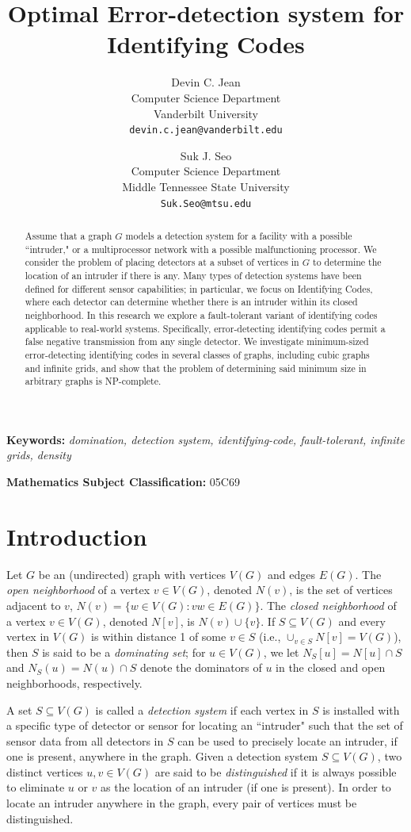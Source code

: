 \documentclass{article}
\title{Optimal Error-detection system for Identifying Codes}
\author{
    \small Devin C. Jean\\
    \small Computer Science Department \\
    \small Vanderbilt University\\
    \small \texttt{devin.c.jean@vanderbilt.edu}
    \and
    \small Suk J. Seo\\
    \small Computer Science Department\\
    \small Middle Tennessee State University\\
    \small \texttt{Suk.Seo@mtsu.edu}
}
\date{}
\begin{document}
\maketitle
\thispagestyle{empty}

\begin{abstract}
Assume that a graph $G$ models a detection system for a facility with a possible ``intruder," or a multiprocessor network with a possible malfunctioning processor.
We consider the problem of placing detectors at a subset of vertices in $G$ to determine the location of an intruder if there is any.
Many types of detection systems have been defined for different sensor capabilities; in particular, we focus on Identifying Codes, where each detector can determine whether there is an intruder within its closed neighborhood.
In this research we explore a fault-tolerant variant of identifying codes applicable to real-world systems.
Specifically, error-detecting identifying codes permit a false negative transmission from any single detector.
We investigate minimum-sized error-detecting identifying codes in several classes of graphs, including cubic graphs and infinite grids, and show that the problem of determining said minimum size in arbitrary graphs is NP-complete.
\end{abstract}

\noindent
\textbf{Keywords:} \textit{domination, detection system, identifying-code, fault-tolerant, infinite grids, density}
\vspace{1em}

\noindent
\textbf{Mathematics Subject Classification:} 05C69

\section{Introduction}
Let $G$ be an (undirected) graph with vertices $V(G)$ and edges $E(G)$.
The \textit{open neighborhood} of a vertex $v \in V(G)$, denoted $N(v)$, is
the set of vertices adjacent to $v$, $N(v) = \{w\in V(G): vw\in E(G)\}$.
The \textit{closed neighborhood} of a vertex $v \in V(G)$, denoted $N[v]$, is $N(v) \cup \{v\}$.
If $S \subseteq V(G)$ and every vertex in $V(G)$ is within distance 1 of some $v \in S$ (i.e., $\cup_{v \in S}{N[v]} = V(G)$), then $S$ is said to be a \emph{dominating set}; for $u \in V(G)$, we let $N_S[u] = N[u] \cap S$ and $N_S(u) = N(u) \cap S$ denote the dominators of $u$ in the closed and open neighborhoods, respectively.

A set $S \subseteq V(G)$ is called a \emph{detection system} if each vertex in $S$ is installed with a specific type of detector or sensor for locating an ``intruder" such that the set of sensor data from all detectors in $S$ can be used to precisely locate an intruder, if one is present, anywhere in the graph.
Given a detection system $S \subseteq V(G)$, two distinct vertices $u,v \in V(G)$ are said to be \emph{distinguished} if it is always possible to eliminate $u$ or $v$ as the location of an intruder (if one is present).
In order to locate an intruder anywhere in the graph, every pair of vertices must be distinguished.
\end{document}
